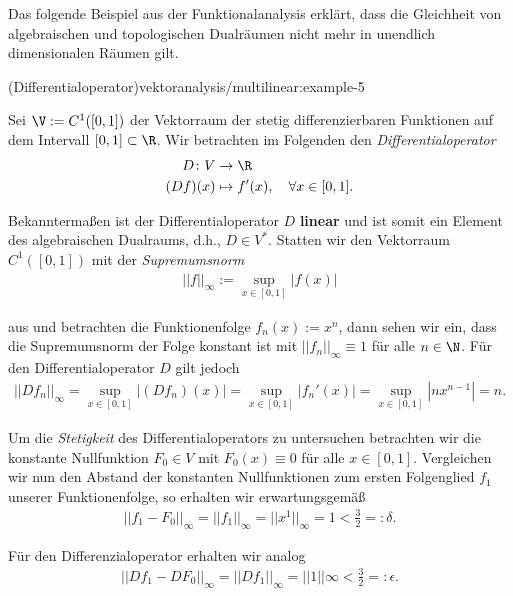 \documentclass[letterpaper,10pt,english]{jupyterBook}
\begin{document}
\par
Das folgende Beispiel aus der Funktionalanalysis erklärt, dass die Gleichheit von algebraischen und topologischen Dualräumen nicht mehr in unendlich dimensionalen Räumen gilt.
\begin{example}{(Differentialoperator)}{vektoranalysis/multilinear:example-5}



\par
Sei \(\V := C^1([0,1])\) der Vektorraum der stetig differenzierbaren Funktionen auf dem Intervall \([0,1] \subset \R\).
Wir betrachten im Folgenden den \emph{Differentialoperator}
\begin{align*}
D \colon V &\rightarrow \R \\
(Df)(x) &\mapsto f'(x), \quad \forall x \in [0,1].
\end{align*}
\par
Bekanntermaßen ist der Differentialoperator \(D\) \textbf{linear} und ist somit ein Element des algebraischen Dualraums, d.h., \(D \in V^\ast\).
Statten wir den Vektorraum \(C^1([0,1])\) mit der \emph{Supremumsnorm}
\begin{align*}
||f||_\infty := \sup_{x \in [0,1]} |f(x)|
\end{align*}
\par
aus und betrachten die Funktionenfolge \(f_n(x) := x^n\), dann sehen wir ein, dass die Supremumsnorm der Folge konstant ist mit \(||f_n||_\infty \equiv 1\) für alle \(n\in\N\).
Für den Differentialoperator \(D\) gilt jedoch
\begin{align*}
||Df_n||_\infty = \sup_{x \in [0,1]} |(Df_n)(x)| = \sup_{x \in [0,1]} |f_n'(x)| = \sup_{x \in [0,1]} |nx^{n-1}| = n.
\end{align*}
\par
Um die \emph{Stetigkeit} des Differentialoperators zu untersuchen betrachten wir die konstante Nullfunktion \(F_0 \in V\) mit \(F_0(x) \equiv 0\) für alle \(x \in [0,1]\).
Vergleichen wir nun den Abstand der konstanten Nullfunktionen zum ersten Folgenglied \(f_1\) unserer Funktionenfolge, so erhalten wir erwartungsgemäß
\begin{align*}
||f_1 - F_0||_\infty = ||f_1||_\infty = ||x^1||_\infty = 1 < \frac{3}{2} =: \delta.
\end{align*}
\par
Für den Differenzialoperator erhalten wir analog
\begin{align*}
||Df_1 - DF_0||_\infty = ||Df_1||_\infty = ||1||\infty < \frac{3}{2} =: \epsilon.
\end{align*}

\end{example}
\end{document}
